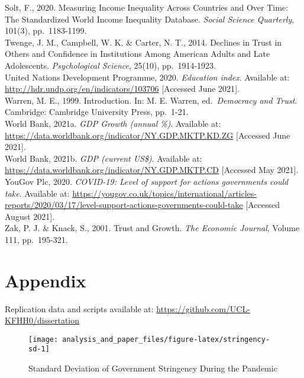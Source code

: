 \documentclass[
  12pt,
]{article}
\begin{document}
Solt, F., 2020. Measuring Income Inequality Across Countries and Over Time: The Standardized World Income Inequality Database. \emph{Social Science Quarterly}, 101(3), pp.~1183-1199.\\
Twenge, J. M., Campbell, W. K. \& Carter, N. T., 2014. Declines in Trust in Others and Confidence in Institutions Among American Adults and Late Adolescents. \emph{Psychological Science}, 25(10), pp.~1914-1923.\\
United Nations Development Programme, 2020. \emph{Education index}. Available at: \url{http://hdr.undp.org/en/indicators/103706} {[}Accessed June 2021{]}.\\
Warren, M. E., 1999. Introduction. In: M. E. Warren, ed.~\emph{Democracy and Trust}. Cambridge: Cambridge University Press, pp.~1-21.\\
World Bank, 2021a. \emph{GDP Growth (annual \%)}. Available at: \url{https://data.worldbank.org/indicator/NY.GDP.MKTP.KD.ZG} {[}Accessed June 2021{]}.\\
World Bank, 2021b. \emph{GDP (current US\$)}. Available at: \url{https://data.worldbank.org/indicator/NY.GDP.MKTP.CD} {[}Accessed May 2021{]}.\\
YouGov Plc, 2020. \emph{COVID-19: Level of support for actions governments could take}. Available at: \url{https://yougov.co.uk/topics/international/articles-reports/2020/03/17/level-support-actions-governments-could-take} {[}Accessed August 2021{]}.\\
Zak, P. J. \& Knack, S., 2001. Trust and Growth. \emph{The Economic Journal}, Volume 111, pp.~195-321.\\

\newpage

\hypertarget{appendix}{%
\section*{Appendix}\label{appendix}}

\setcounter{table}{0}  \renewcommand{\thetable}{A\arabic{table}} \setcounter{figure}{0} \renewcommand{\thefigure}{A\arabic{figure}}

Replication data and scripts available at: \url{https://github.com/UCL-KFHH0/dissertation}\\

\begin{figure}
\texttt{[image: analysis\_and\_paper\_files/figure-latex/stringency-sd-1]} \caption{Standard Deviation of Government Stringency During the Pandemic}\label{fig:stringency-sd}
\end{figure}
\end{document}
